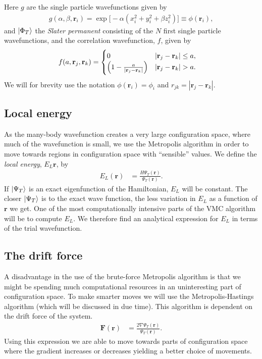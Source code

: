 \documentclass[
    a4paper, aps, twocolumn, floatfix, superscriptaddress, nofootinbib]{revtex4-1}
\newcommand{\vf}{\mathbf}
\newcommand{\1}{\mathds{1}}
\begin{document}
    Here $g$ are the single particle wavefunctions given by
    \begin{align}
        g(\alpha, \beta, \vf{r}_i)
        = \exp\bigl[
            -\alpha(x_i^2 + y_i^2 + \beta z_i^2)
        \bigr] \equiv \phi(\vf{r}_i),
    \end{align}
    and $\ket{\Phi_T}$ the \textit{Slater permanent} consisting of the $N$ first
    single particle wavefunctions, and the correlation wavefunction, $f$, given
    by
    \begin{align}
        f(a, \vf{r}_j, \vf{r}_k)
        &=
        \begin{cases}
            0 & |\vf{r}_j - \vf{r}_k| \leq a, \\
            \Bigl(
                1 - \frac{a}{|\vf{r}_j - \vf{r}_k|}
            \Bigr) & |\vf{r}_j - \vf{r}_k| > a.
        \end{cases}
    \end{align}
    We will for brevity use the notation $\phi(\vf{r}_i) = \phi_i$ and $r_{jk} =
    |\vf{r}_j - \vf{r}_k|$.

    \subsection{Local energy}
        As the many-body wavefunction creates a very large configuration space,
        where much of the wavefunction is small, we use the Metropolis algorithm
        in order to move towards regions in configuration space with
        ``sensible'' values. We define the \textit{local energy}, $E_L{\vf{r}}$,
        by
        \begin{align}
            E_L(\vf{r})
            &= \frac{H\Psi_T(\vf{r})}{\Psi_T(\vf{r})}.
        \end{align}
        If $\ket{\Psi_T}$ is an exact eigenfunction of the Hamiltonian, $E_L$
        will be constant. The closer $\ket{\Psi_T}$ is to the exact wave
        function, the less variation in $E_L$ as a function of $\vf{r}$ we get.
        One of the most computationally intensive parts of the VMC algorithm
        will be to compute $E_L$. We therefore find an analytical expression for
        $E_L$ in terms of the trial wavefunction.

    \subsection{The drift force}
        A disadvantage in the use of the brute-force Metropolis algorithm is
        that we might be spending much computational resources in an
        uninteresting part of configuration space. To make smarter moves we will
        use the Metropolis-Hastings algorithm (which will be discussed in due
        time). This algorithm is dependent on the drift force of the system.
        \begin{align}
            \vf{F}(\vf{r})
            &=
            \frac{2\nabla\Psi_T(\vf{r})}{\Psi_T(\vf{r})}.
        \end{align}
        Using this expression we are able to move towards parts of
        configuration space where the gradient increases or decreases yielding a
        better choice of movements.
\end{document}
